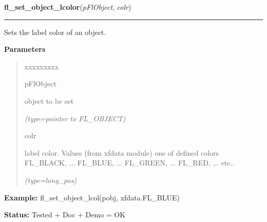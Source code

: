 \hspace{.8\funcindent}\begin{boxedminipage}{\funcwidth}

    \raggedright \textbf{fl\_set\_object\_lcolor}(\textit{pFlObject}, \textit{colr})

    \vspace{-1.5ex}

    \rule{\textwidth}{0.5\fboxrule}
\setlength{\parskip}{2ex}
    Sets the label color of an object.

\setlength{\parskip}{1ex}
      \textbf{Parameters}
      \vspace{-1ex}

      \begin{quote}
        \begin{Ventry}{xxxxxxxxx}

          \item[pFlObject]

          object to be set

            {\it (type=pointer to FL\_OBJECT)}

          \item[colr]

          label color. Values (from xfdata module) one of defined colors 
          FL\_BLACK, ... FL\_BLUE, ... FL\_GREEN, ... FL\_RED, ... etc..

            {\it (type=long\_pos)}

        \end{Ventry}

      \end{quote}

\textbf{Example:} fl\_set\_object\_lcol(pobj, xfdata.FL\_BLUE)



\textbf{Status:} Tested + Doc + Demo = OK



    \end{boxedminipage}

    \label{xformslib:flbasic:fl_get_object_lcol}

    \vspace{0.5ex}

